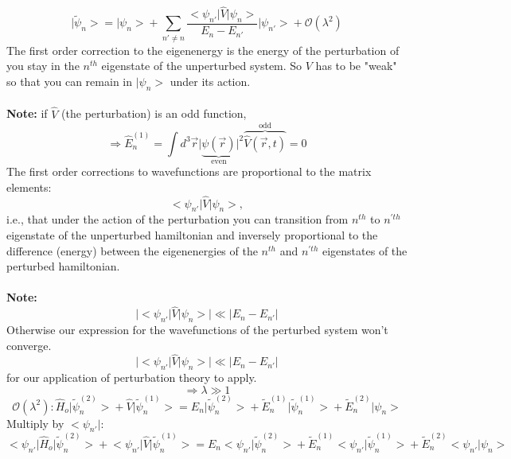 \documentclass[12pt,fancychapters]{report}
\numberwithin{equation}{section}
\begin{document}
\begin{equation*}
	\big| \tilde{\psi}_n \big> = \big| \psi_n \big> +\sum_{n' \neq n}
	\frac{\big< \psi_{n'}\big|\hat{V}\big|\psi_n\big>}{E_n - E_{n'}}\big|\psi_{n'}\big> + \mathcal{O}(\lambda^2)
\end{equation*}
The first order correction to the eigenenergy is the energy of the perturbation of you stay in the
$n^{th}$ eigenstate of the unperturbed system. So $V$ has to be "weak" so that you can remain in
$\big|\psi_n\big>$ under its action.\\
\\
\textbf{Note:} if $\hat{V}$ (the perturbation) is an odd function,
\begin{equation*}
	\Longrightarrow \hat{E}^{(1)}_n = \int d^3 \vec{r}\big|\underbrace{\psi(\vec{r})}_\text{even}
	\big|^2 \overbrace{\hat{V}(\vec{r}, t)}^\text{odd} = 0
\end{equation*}
The first order corrections to wavefunctions are proportional to the matrix elements: 
$$\big<\psi_{n'}\big|\hat{V}\big|\psi_n\big>,$$
i.e., that under the action of the perturbation you can transition from $n^{th}$ to $n^{'th}$ 
eigenstate of the unperturbed hamiltonian and inversely proportional to the difference (energy)
between the eigenenergies of the $n^{th}$ and $n^{'th}$  eigenstates of the perturbed hamiltonian.\\
\\
\textbf{Note:}
\begin{equation*}
	\big|\big<\psi_{n'} \big| \hat{V}\big| \psi_n \big> \big| \ll \big|E_n - E_{n'}\big|
\end{equation*}
Otherwise our expression for the wavefunctions of the perturbed system won't converge.
$$	\big|\big<\psi_{n'} \big| \hat{V}\big| \psi_n \big> \big| \ll \big|E_n - E_{n'}\big|$$ 
for our application of perturbation theory to apply.
$$\Longrightarrow \lambda \gg 1$$
\begin{equation*}
	\mathcal{O}(\lambda ^2): \hat{H}_o \big|\tilde{\psi}^{(2)}_n\big> + \hat{V}\big|\tilde{\psi}^{(1)}_n\big>
	= E_n \big|\tilde{\psi}^{(2)}_n \big> + \tilde{E}^{(1)}_n \big|\tilde{\psi}^{(1)}_n \big>
	+ \tilde{E}^{(2)}_n \big| \psi_n \big>
\end{equation*}
Multiply by $\big< \psi_{n'} \big|$:
\begin{equation*}
	\big< \psi_{n'} \big|\hat{H}_o \big|\tilde{\psi}^{(2)}_n\big> + 
	\big< \psi_{n'} \big|\hat{V}\big|\tilde{\psi}^{(1)}_n\big>
	= E_n \big< \psi_{n'} \big|\tilde{\psi}^{(2)}_n \big> + 
	\tilde{E}^{(1)}_n \big< \psi_{n'} \big|\tilde{\psi}^{(1)}_n \big>
	+ \tilde{E}^{(2)}_n \big< \psi_{n'} \big| \psi_n \big>	
\end{equation*}
\end{document}
